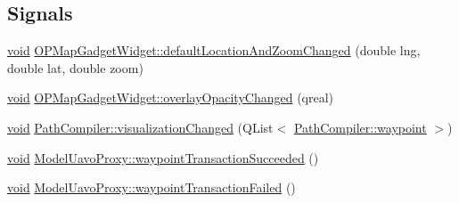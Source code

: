 \subsection*{\-Signals}
\begin{DoxyCompactItemize}
\item 
\hyperlink{group___u_a_v_objects_plugin_ga444cf2ff3f0ecbe028adce838d373f5c}{void} \hyperlink{group___o_p_map_plugin_ga1e2bbe9f774b6c505ba7645a868f1c52}{\-O\-P\-Map\-Gadget\-Widget\-::default\-Location\-And\-Zoom\-Changed} (double lng, double lat, double zoom)
\item 
\hyperlink{group___u_a_v_objects_plugin_ga444cf2ff3f0ecbe028adce838d373f5c}{void} \hyperlink{group___o_p_map_plugin_gaa3099fde3c8867538207ed89067345eb}{\-O\-P\-Map\-Gadget\-Widget\-::overlay\-Opacity\-Changed} (qreal)
\item 
\hyperlink{group___u_a_v_objects_plugin_ga444cf2ff3f0ecbe028adce838d373f5c}{void} \hyperlink{group___o_p_map_plugin_ga9b1e292fa1cea559f4177ac8adb8d19d}{\-Path\-Compiler\-::visualization\-Changed} (\-Q\-List$<$ \hyperlink{class_path_compiler_1_1waypoint}{\-Path\-Compiler\-::waypoint} $>$)
\item 
\hyperlink{group___u_a_v_objects_plugin_ga444cf2ff3f0ecbe028adce838d373f5c}{void} \hyperlink{group___o_p_map_plugin_gaf5825b310723b58fb271811c478954ec}{\-Model\-Uavo\-Proxy\-::waypoint\-Transaction\-Succeeded} ()
\item 
\hyperlink{group___u_a_v_objects_plugin_ga444cf2ff3f0ecbe028adce838d373f5c}{void} \hyperlink{group___o_p_map_plugin_gafd0e6a7bd5963a1363aace5cbdaac47f}{\-Model\-Uavo\-Proxy\-::waypoint\-Transaction\-Failed} ()
\end{DoxyCompactItemize}

